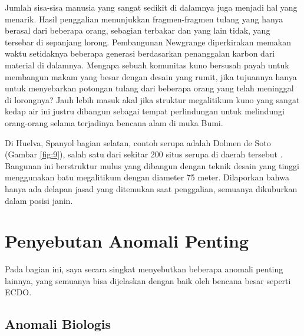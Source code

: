 \documentclass[10pt,twocolumn,letterpaper]{article}
\begin{document}
Jumlah sisa-sisa manusia yang sangat sedikit di dalamnya juga menjadi hal yang menarik. Hasil penggalian menunjukkan fragmen-fragmen tulang yang hanya berasal dari beberapa orang, sebagian terbakar dan yang lain tidak, yang tersebar di sepanjang lorong. Pembangunan Newgrange diperkirakan memakan waktu setidaknya beberapa generasi berdasarkan penanggalan karbon dari material di dalamnya. Mengapa sebuah komunitas kuno bersusah payah untuk membangun makam yang besar dengan desain yang rumit, jika tujuannya hanya untuk menyebarkan potongan tulang dari beberapa orang yang telah meninggal di lorongnya? Jauh lebih masuk akal jika struktur megalitikum kuno yang sangat kedap air ini justru dibangun sebagai tempat perlindungan untuk melindungi orang-orang selama terjadinya bencana alam di muka Bumi.

Di Huelva, Spanyol bagian selatan, contoh serupa adalah Dolmen de Soto (Gambar \ref{fig:9}), salah satu dari sekitar 200 situs serupa di daerah tersebut \cite{72,32}. Bangunan ini berstruktur mulus yang dibangun dengan teknik desain yang tinggi menggunakan batu megalitikum dengan diameter 75 meter. Dilaporkan bahwa hanya ada delapan jasad yang ditemukan saat penggalian, semuanya dikuburkan dalam posisi janin.

\section{Penyebutan Anomali Penting}

Pada bagian ini, saya secara singkat menyebutkan beberapa anomali penting lainnya, yang semuanya bisa dijelaskan dengan baik oleh bencana besar seperti ECDO.

\subsection{Anomali Biologis}
\end{document}
